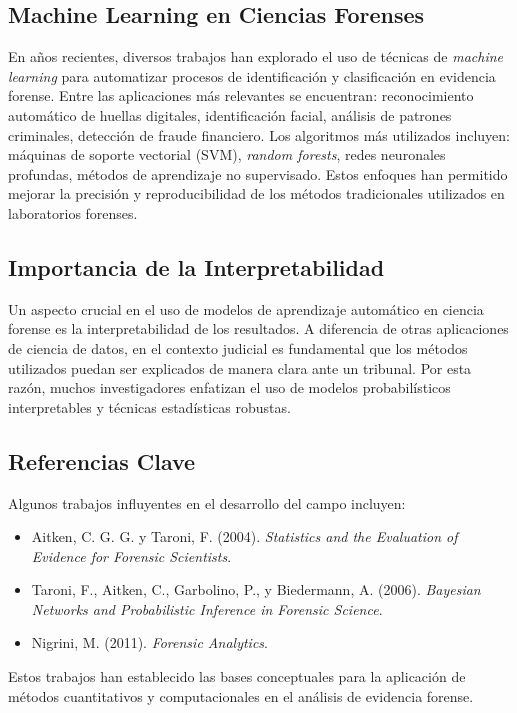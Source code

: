 \documentclass[a4paper,10pt,oneside]{article}
\begin{document}
\subsection{Machine Learning en Ciencias Forenses}

En a\~nos recientes, diversos trabajos han explorado el uso de t\'ecnicas de \textit{machine learning} para automatizar procesos de identificaci\'on y clasificaci\'on en evidencia forense. Entre las aplicaciones m\'as relevantes se encuentran: reconocimiento autom\'atico de huellas digitales, identificaci\'on facial, an\'alisis de patrones criminales, detecci\'on de fraude financiero. Los algoritmos m\'as utilizados incluyen: m\'aquinas de soporte vectorial (SVM), \textit{random forests}, redes neuronales profundas, m\'etodos de aprendizaje no supervisado. Estos enfoques han permitido mejorar la precisi\'on y reproducibilidad de los m\'etodos tradicionales utilizados en laboratorios forenses.

\subsection{Importancia de la Interpretabilidad}

Un aspecto crucial en el uso de modelos de aprendizaje autom\'atico en ciencia forense es la interpretabilidad de los resultados. A diferencia de otras aplicaciones de ciencia de datos, en el contexto judicial es fundamental que los m\'etodos utilizados puedan ser explicados de manera clara ante un tribunal. Por esta raz\'on, muchos investigadores enfatizan el uso de modelos probabil\'isticos interpretables y t\'ecnicas estad\'isticas robustas.

\subsection{Referencias Clave}

Algunos trabajos influyentes en el desarrollo del campo incluyen:
\begin{itemize}
\item Aitken, C. G. G. y Taroni, F. (2004). \textit{Statistics and the Evaluation of Evidence for Forensic Scientists}.
\item Taroni, F., Aitken, C., Garbolino, P., y Biedermann, A. (2006). \textit{Bayesian Networks and Probabilistic Inference in Forensic Science}.
\item Nigrini, M. (2011). \textit{Forensic Analytics}.
\end{itemize}
Estos trabajos han establecido las bases conceptuales para la aplicaci\'on de m\'etodos cuantitativos y computacionales en el an\'alisis de evidencia forense.
\end{document}
